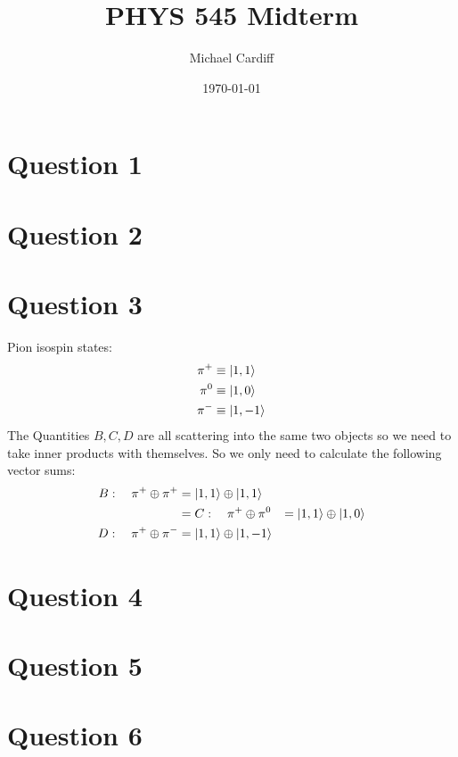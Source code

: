 \documentclass[12pt]{article}
\title{\vspace{-3em}PHYS 545 Midterm}
\author{Michael Cardiff}
\date{\today}
\begin{document}
\maketitle
\section*{Question 1}
\section*{Question 2}
\section*{Question 3}
Pion isospin states:
\begin{align*}
  \pi^+&\equiv\ket{1,1}\\
  \pi^0&\equiv\ket{1,0}\\
  \pi^-&\equiv\ket{1,-1}
\end{align*}
The Quantities $B,C,D$ are all scattering into the same two objects so we need to take inner products with themselves. So we only need to calculate the following vector sums:
\begin{align*}
  B:\quad \pi^+\oplus\pi^+&=\ket{1,1}\oplus\ket{1,1} \\
  &=
  C:\quad \pi^+\oplus\pi^0&=\ket{1,1}\oplus\ket{1,0} \\
  D:\quad \pi^+\oplus\pi^-&=\ket{1,1}\oplus\ket{1,-1} 
\end{align*}
\section*{Question 4}
\section*{Question 5}
\section*{Question 6}
\end{document}
